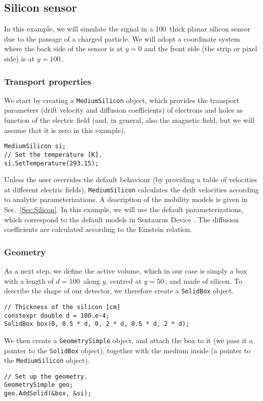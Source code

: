 \subsection{Silicon sensor}\label{Sec:ExampleSilicon}
In this example, we will simulate the signal in a 100\, thick 
planar silicon sensor due to the passage of a charged particle. 
We will adopt a coordinate system where the back side of the sensor is at 
$y = 0$ and the front side (\ie the strip or pixel side) is at $y = 100$\,.

\subsubsection{Transport properties}
We start by creating a \texttt{MediumSilicon} object, 
which provides the transport parameters (\eg drift velocity and 
diffusion coefficients) of electrons and holes as function 
of the electric field (and, in general, also the magnetic field, 
but we will assume that it is zero in this example).
\begin{lstlisting}
MediumSilicon si;
// Set the temperature [K].
si.SetTemperature(293.15);
\end{lstlisting}
Unless the user overrides the default behaviour 
(by providing a table of velocities at different electric fields), 
\texttt{MediumSilicon} calculates the drift velocities according to 
analytic parameterizations. 
A description of the mobility models is given in Sec.~\ref{Sec:Silicon}.
In this example, we will use the default parameterizations, 
which correspond to the default models in Sentaurus Device \cite{Synopsys}. 
The diffusion coefficients are calculated according to the Einstein relation.

\subsubsection{Geometry}
As a next step, we define the active volume, 
which in our case is simply a box with a length of $d = 100$\, 
along $y$, centred at $y = 50$\,, and made of silicon. 
To describe the shape of our detector, 
we therefore create a \texttt{SolidBox} object.
\begin{lstlisting}
// Thickness of the silicon [cm]
constexpr double d = 100.e-4;
SolidBox box(0, 0.5 * d, 0, 2 * d, 0.5 * d, 2 * d);
\end{lstlisting}
We then create a \texttt{GeometrySimple} object, and attach the box to it 
(\ie we pass it a pointer to the \texttt{SolidBox} object), 
together with the medium inside 
(\ie a pointer to the \texttt{MediumSilicon} object).
\begin{lstlisting}
// Set up the geometry.
GeometrySimple geo;
geo.AddSolid(&box, &si);
\end{lstlisting}

